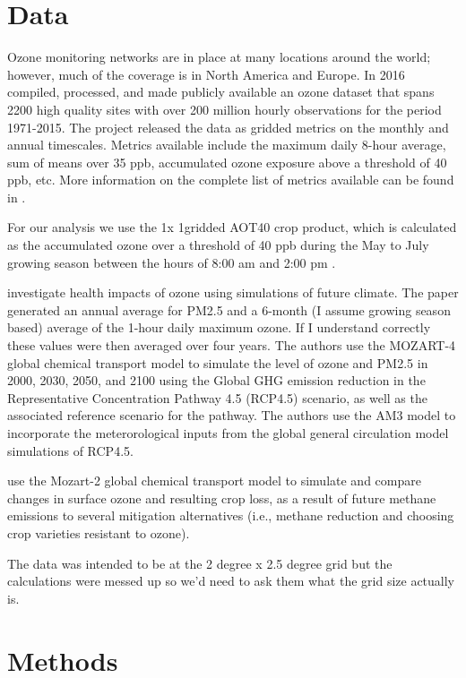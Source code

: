 \documentclass[10pt]{amsart}
\begin{document}
\section{Data}
Ozone monitoring networks are in place at many locations around the world; however, much of the coverage is in North America and Europe. 
In 2016 \cite{sofen:2016aa} compiled, processed, and made publicly available an ozone dataset that spans 2200 high quality sites with over 200 million hourly observations for the period 1971-2015.
The project released the data as gridded metrics on the monthly and annual timescales.
Metrics available include the maximum daily 8-hour average, sum of means over 35 ppb, accumulated ozone exposure above a threshold of 40 ppb, etc. 
More information on the complete list of metrics available can be found in \cite{sofen:2016aa}.

For our analysis we use the 1\degree x 1\degree gridded AOT40 crop product, which is calculated as the accumulated ozone over a threshold of 40 ppb during the May to July growing season between the hours of 8:00 am and 2:00 pm \parencite{sofen:2016aa}.

\cite{} investigate health impacts of ozone using simulations of future climate. 
The \cite{j:2013aa} paper generated an annual average for PM2.5 and a 6-month (I assume growing season based) average of the 1-hour daily maximum ozone. 
If I understand correctly these values were then averaged over four years. 
The authors use the MOZART-4 global chemical transport model to simulate the level of ozone and PM2.5 in 2000, 2030, 2050, and 2100 using the Global GHG emission reduction in the Representative Concentration Pathway 4.5 (RCP4.5) scenario, as well as the associated reference scenario for the pathway.
The authors use the AM3 model to incorporate the meterorological inputs from the global general circulation model simulations of RCP4.5.  

\cite{avnery:2013aa} use the Mozart-2 global chemical transport model to simulate and compare changes in surface ozone and resulting crop loss, as a result of future methane emissions to several mitigation alternatives (i.e., methane reduction and choosing crop varieties resistant to ozone). 

The data was intended to be at the 2 degree x 2.5 degree grid but the calculations were messed up so we'd need to ask them what the grid size actually is. 


\section{Methods}


\printbibliography
\end{document}
